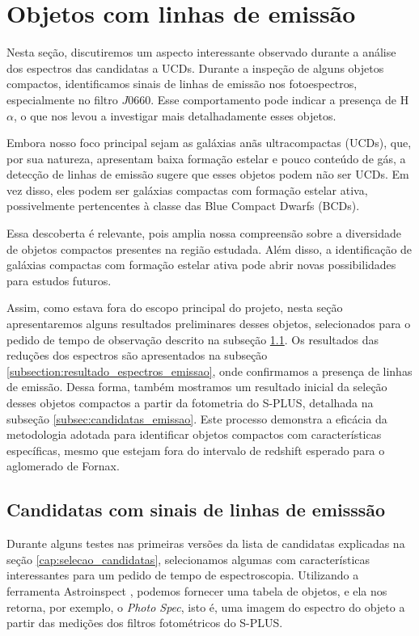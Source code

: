 \section{Objetos com linhas de emissão}\label{sec:objetos_linhas_emissao}
Nesta seção, discutiremos um aspecto interessante observado durante a análise dos espectros das candidatas a UCDs. Durante a inspeção de alguns objetos compactos, identificamos sinais de linhas de emissão nos fotoespectros, especialmente no filtro $J0660$. Esse comportamento pode indicar a presença de H$\alpha$, o que nos levou a investigar mais detalhadamente esses objetos. 

Embora nosso foco principal sejam as galáxias anãs ultracompactas (UCDs), que, por sua natureza, apresentam baixa formação estelar e pouco conteúdo de gás, a detecção de linhas de emissão sugere que esses objetos podem não ser UCDs. Em vez disso, eles podem ser galáxias compactas com formação estelar ativa, possivelmente pertencentes à classe das Blue Compact Dwarfs (BCDs). 

Essa descoberta é relevante, pois amplia nossa compreensão sobre a diversidade de objetos compactos presentes na região estudada. Além disso, a identificação de galáxias compactas com formação estelar ativa pode abrir novas possibilidades para estudos futuros.

Assim, como estava fora do escopo principal do projeto, nesta seção apresentaremos alguns resultados preliminares desses objetos, selecionados para o pedido de tempo de observação descrito na subseção \ref{subsection:candidatas_emissao}. Os resultados das reduções dos espectros são apresentados na subseção \ref{subsection:resultado_espectros_emissao}, onde confirmamos a presença de linhas de emissão. Dessa forma, também mostramos um resultado inicial da seleção desses objetos compactos a partir da fotometria do S-PLUS, detalhada na subseção \ref{subsec:candidatas_emissao}. Este processo demonstra a eficácia da metodologia adotada para identificar objetos compactos com características específicas, mesmo que estejam fora do intervalo de redshift esperado para o aglomerado de Fornax.

\subsection{Candidatas com sinais de linhas de emisssão}\label{subsection:candidatas_emissao}

Durante alguns testes nas primeiras versões da lista de candidatas explicadas na seção \ref{cap:selecao_candidatas}, selecionamos algumas com características interessantes para um pedido de tempo de espectroscopia. Utilizando a ferramenta Astroinspect \cite{astroinspect}, podemos fornecer uma tabela de objetos, e ela nos retorna, por exemplo, o \textit{Photo Spec}, isto é, uma imagem do espectro do objeto a partir das medições dos filtros fotométricos do S-PLUS.


